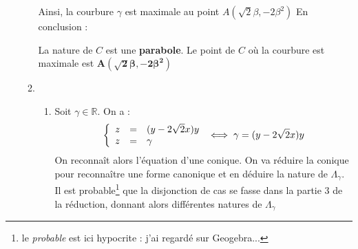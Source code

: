 \begin{enumerate}
\begin{enumerate}
                Ainsi, la courbure $\gamma$ est maximale au point $A(\sqrt{2}\beta, -2\beta^{2})$
                En conclusion :
                \begin{result}
                  La nature de $C$ est une \textbf{parabole}.
                  Le point de $C$ où la courbure est maximale est $\boldsymbol{A(\sqrt{2}\beta, -2\beta^{2})}$
                \end{result}
          \item \begin{enumerate}
                  \item Soit $\gamma \in\mathbb{R}$. On a :
                        \[
                          \left\{
                          \begin{array}{r c l}
                            z & = & (y - 2\sqrt{2}x)y \\
                            z & = & \gamma            \\
                          \end{array}
                          \right.
                          \iff
                          \gamma = (y - 2\sqrt{2}x)y
                        \]
                        On reconnaît alors l'équation d'une conique. On va réduire la conique pour reconnaître
                        une forme canonique et en déduire la nature de $\Lambda_\gamma$.
                        Il est probable\footnote{le \textit{probable} est ici hypocrite : j'ai regardé sur Geogebra... \frownie{}}
                        que la disjonction de cas se fasse dans la partie 3 de la réduction, donnant alors différentes natures
                        de $\Lambda_\gamma$
\end{enumerate}
\end{enumerate}
\end{enumerate}
